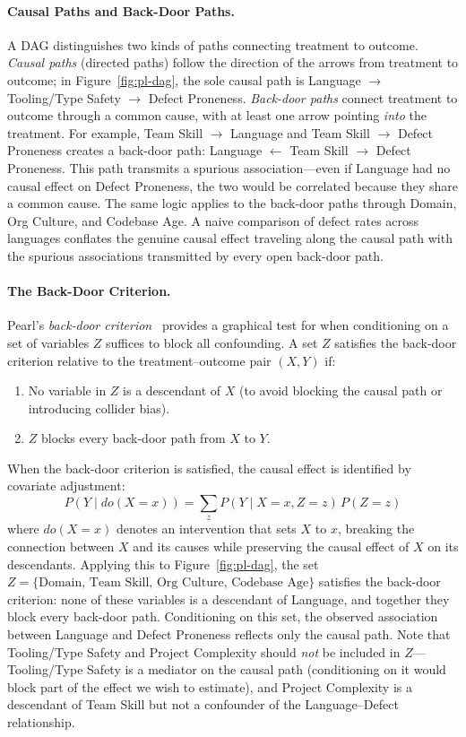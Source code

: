 \paragraph{Causal Paths and Back-Door Paths.}
A DAG distinguishes two kinds of paths connecting treatment to outcome.
\emph{Causal paths} (directed paths) follow the direction of the arrows from treatment to outcome; in Figure~\ref{fig:pl-dag}, the sole causal path is Language $\to$ Tooling/Type Safety $\to$ Defect Proneness.
\emph{Back-door paths} connect treatment to outcome through a common cause, with at least one arrow pointing \emph{into} the treatment.
For example, Team Skill $\to$ Language and Team Skill $\to$ Defect Proneness creates a back-door path: Language $\leftarrow$ Team Skill $\to$ Defect Proneness.
This path transmits a spurious association---even if Language had no causal effect on Defect Proneness, the two would be correlated because they share a common cause.
The same logic applies to the back-door paths through Domain, Org Culture, and Codebase Age.
A naive comparison of defect rates across languages conflates the genuine causal effect traveling along the causal path with the spurious associations transmitted by every open back-door path.

\paragraph{The Back-Door Criterion.}
Pearl's \emph{back-door criterion}~\cite{pearl2009causality} provides a graphical test for when conditioning on a set of variables $Z$ suffices to block all confounding.
A set $Z$ satisfies the back-door criterion relative to the treatment--outcome pair $(X, Y)$ if:
\begin{enumerate}[leftmargin=15pt]
    \item No variable in $Z$ is a descendant of $X$ (to avoid blocking the causal path or introducing collider bias).
    \item $Z$ blocks every back-door path from $X$ to $Y$.
\end{enumerate}
When the back-door criterion is satisfied, the causal effect is identified by covariate adjustment:
\begin{equation}
    P(Y \mid do(X = x)) = \sum_z P(Y \mid X = x, Z = z)\, P(Z = z)
    \label{eq:backdoor-adj}
\end{equation}
where $do(X = x)$ denotes an intervention that sets $X$ to $x$, breaking the connection between $X$ and its causes while preserving the causal effect of $X$ on its descendants.
Applying this to Figure~\ref{fig:pl-dag}, the set $Z = \{\text{Domain},\, \text{Team Skill},\, \text{Org Culture},\, \text{Codebase Age}\}$ satisfies the back-door criterion: none of these variables is a descendant of Language, and together they block every back-door path.
Conditioning on this set, the observed association between Language and Defect Proneness reflects only the causal path.
Note that Tooling/Type Safety and Project Complexity should \emph{not} be included in $Z$---Tooling/Type Safety is a mediator on the causal path (conditioning on it would block part of the effect we wish to estimate), and Project Complexity is a descendant of Team Skill but not a confounder of the Language--Defect relationship.

